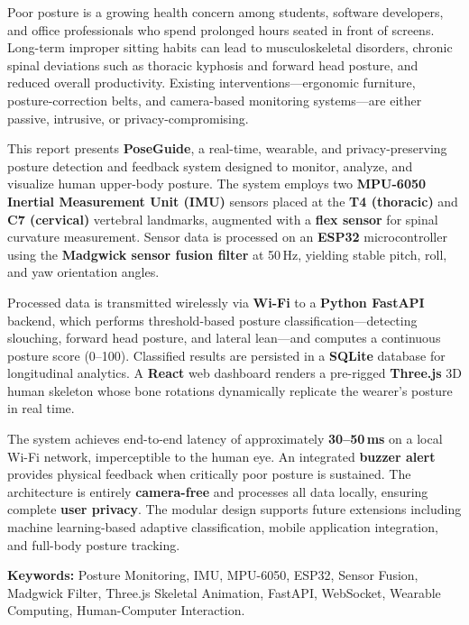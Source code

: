 \documentclass[12pt,a4paper]{report}
\newcommand{\keyword}[1]{\textbf{\textcolor{primaryblue}{#1}}}
\begin{document}
{
Poor posture is a growing health concern among students, software developers, and office professionals who spend prolonged hours seated in front of screens. Long-term improper sitting habits can lead to musculoskeletal disorders, chronic spinal deviations such as thoracic kyphosis and forward head posture, and reduced overall productivity. Existing interventions—ergonomic furniture, posture-correction belts, and camera-based monitoring systems—are either passive, intrusive, or privacy-compromising.

This report presents \textbf{PoseGuide}, a real-time, wearable, and privacy-preserving posture detection and feedback system designed to monitor, analyze, and visualize human upper-body posture. The system employs two \textbf{MPU-6050 Inertial Measurement Unit (IMU)} sensors placed at the \textbf{T4 (thoracic)} and \textbf{C7 (cervical)} vertebral landmarks, augmented with a \textbf{flex sensor} for spinal curvature measurement. Sensor data is processed on an \textbf{ESP32} microcontroller using the \textbf{Madgwick sensor fusion filter} at 50\,Hz, yielding stable pitch, roll, and yaw orientation angles.

Processed data is transmitted wirelessly via \textbf{Wi-Fi} to a \textbf{Python FastAPI} backend, which performs threshold-based posture classification—detecting slouching, forward head posture, and lateral lean—and computes a continuous posture score (0--100). Classified results are persisted in a \textbf{SQLite} database for longitudinal analytics. A \textbf{React} web dashboard renders a pre-rigged \textbf{Three.js} 3D human skeleton whose bone rotations dynamically replicate the wearer's posture in real time.

The system achieves end-to-end latency of approximately \textbf{30--50\,ms} on a local Wi-Fi network, imperceptible to the human eye. An integrated \textbf{buzzer alert} provides physical feedback when critically poor posture is sustained. The architecture is entirely \keyword{camera-free} and processes all data locally, ensuring complete \keyword{user privacy}. The modular design supports future extensions including machine learning-based adaptive classification, mobile application integration, and full-body posture tracking.
}

\vspace{1cm}
\noindent\textbf{Keywords:} Posture Monitoring, IMU, MPU-6050, ESP32, Sensor Fusion, Madgwick Filter, Three.js Skeletal Animation, FastAPI, WebSocket, Wearable Computing, Human-Computer Interaction.
\end{document}
